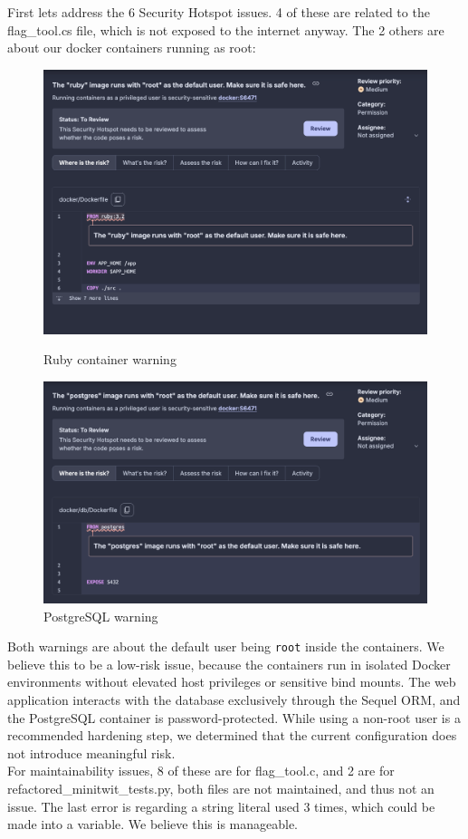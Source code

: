 First lets address the 6 Security Hotspot issues. 4 of these are related to the flag\_tool.cs file, which is not exposed to the internet anyway. The 2 others are about our docker containers running as root: \\

\begin{figure}[h]
  \centering
  \begin{minipage}[t]{0.45\linewidth}
    \centering
    \includegraphics[width=0.9\linewidth]{images/sonarqube-ruby.png}
    \caption{Ruby container warning}
    \label{fig:ruby-warning}
  \end{minipage}%
  \hfill
  \begin{minipage}[t]{0.45\linewidth}
    \centering
    \includegraphics[width=0.9\linewidth]{images/warning_docker.png}
    \caption{PostgreSQL warning}
    \label{fig:postgres-warning}
  \end{minipage}
\end{figure}

Both warnings are about the default user being \texttt{root} inside the containers. We believe this to be a low-risk issue, because the containers run in isolated Docker environments without elevated host privileges or sensitive bind mounts. The web application interacts with the database exclusively through the Sequel ORM, and the PostgreSQL container is password-protected. While using a non-root user is a recommended hardening step, we determined that the current configuration does not introduce meaningful risk. \\

For maintainability issues, 8 of these are for flag\_tool.c, and 2 are for refactored\_minitwit\_tests.py, both files are not maintained, and thus not an issue. The last error is regarding a string literal used 3 times, which could be made into a variable. We believe this is manageable. \\


